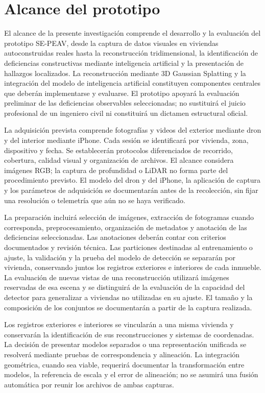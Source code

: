 \documentclass[12pt,oneside]{report}
\begin{document}
\section{Alcance del prototipo}
El alcance de la presente investigación comprende el desarrollo y la evaluación del prototipo SE-PEAV, desde la captura de datos visuales en viviendas autoconstruidas reales hasta la reconstrucción tridimensional, la identificación de deficiencias constructivas mediante inteligencia artificial y la presentación de hallazgos localizados. La reconstrucción mediante 3D Gaussian Splatting y la integración del modelo de inteligencia artificial constituyen componentes centrales que deberán implementarse y evaluarse. El prototipo apoyará la evaluación preliminar de las deficiencias observables seleccionadas; no sustituirá el juicio profesional de un ingeniero civil ni constituirá un dictamen estructural oficial.\par

La adquisición prevista comprende fotografías y videos del exterior mediante dron y del interior mediante iPhone. Cada sesión se identificará por vivienda, zona, dispositivo y fecha. Se establecerán protocolos diferenciados de recorrido, cobertura, calidad visual y organización de archivos. El alcance considera imágenes RGB; la captura de profundidad o LiDAR no forma parte del procedimiento previsto. El modelo del dron y del iPhone, la aplicación de captura y los parámetros de adquisición se documentarán antes de la recolección, sin fijar una resolución o telemetría que aún no se haya verificado.\par

La preparación incluirá selección de imágenes, extracción de fotogramas cuando corresponda, preprocesamiento, organización de metadatos y anotación de las deficiencias seleccionadas. Las anotaciones deberán contar con criterios documentados y revisión técnica. Las particiones destinadas al entrenamiento o ajuste, la validación y la prueba del modelo de detección se separarán por vivienda, conservando juntos los registros exteriores e interiores de cada inmueble. La evaluación de nuevas vistas de una reconstrucción utilizará imágenes reservadas de esa escena y se distinguirá de la evaluación de la capacidad del detector para generalizar a viviendas no utilizadas en su ajuste. El tamaño y la composición de los conjuntos se documentarán a partir de la captura realizada.\par

Los registros exteriores e interiores se vincularán a una misma vivienda y conservarán la identificación de sus reconstrucciones y sistemas de coordenadas. La decisión de presentar modelos separados o una representación unificada se resolverá mediante pruebas de correspondencia y alineación. La integración geométrica, cuando sea viable, requerirá documentar la transformación entre modelos, la referencia de escala y el error de alineación; no se asumirá una fusión automática por reunir los archivos de ambas capturas.\par
\end{document}
